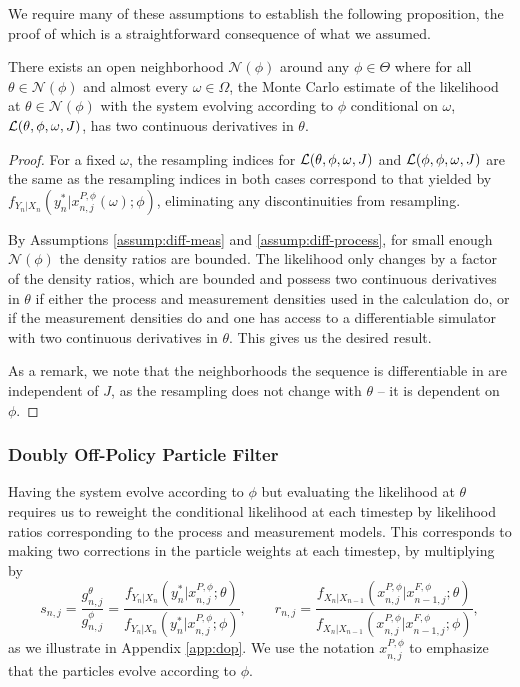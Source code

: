 \documentclass{article}
\begin{document}
We require many of these assumptions to establish the following proposition, the proof of which is a straightforward consequence of what we assumed.

\begin{prop}
\label{prop:smooth-nbhd}
There exists an open neighborhood $\mathcal{N}(\phi)$ around any $\phi \in \Theta$ where for all $\theta \in \mathcal{N}(\phi)$ and almost every $\omega \in \Omega$, the Monte Carlo estimate of the likelihood at $\theta \in \mathcal{N}(\phi)$ with the system evolving according to $\phi$ conditional on $\omega$, $\mathcal{L}(\theta,\phi,\omega, J)$, has two continuous derivatives in $\theta$.
\end{prop}

\begin{proof}
    For a fixed $\omega$, the resampling indices for $\mathcal{L}(\theta,\phi,\omega, J)$ and $\mathcal{L}(\phi,\phi,\omega, J)$ are the same as the resampling indices in both cases correspond to that yielded by $f_{Y_n|X_n}(y_n^*|x_{n,j}^{P,\phi}(\omega);\phi)$, eliminating any discontinuities from resampling. 
    
    By Assumptions \ref{assump:diff-meas} and \ref{assump:diff-process}, for small enough $\mathcal{N}(\phi)$ the density ratios are bounded. The likelihood only changes by a factor of the density ratios, which are bounded and possess two continuous derivatives in $\theta$ if either the process and measurement densities used in the calculation do, or if the measurement densities do and one has access to a differentiable simulator with two continuous derivatives in $\theta$. This gives us the desired result. 

    As a remark, we note that the neighborhoods the sequence is differentiable in are independent of $J$, as the resampling does not change with $\theta$ -- it is dependent on $\phi$. 
\end{proof}



\subsubsection{Doubly Off-Policy Particle Filter}

Having the system evolve according to $\phi$ but evaluating the likelihood at $\theta$ requires us to reweight the conditional likelihood at each timestep by likelihood ratios corresponding to the process and measurement models. This corresponds to making two corrections in the particle weights at each timestep, by multiplying by 
\begin{equation}
    s_{n,j}=\frac{g_{n,j}^\theta}{g_{n,j}^{\phi}}=\frac{f_{Y_n|X_n}(y_n^*|x_{n,j}^{P, \phi}; \theta)}{f_{Y_n|X_n}(y_n^*|x_{n,j}^{P,\phi}; \phi)}, \qquad r_{n,j}=\frac{f_{X_n|X_{n-1}}(x_{n,j}^{P, \phi}|x_{n-1,j}^{F, \phi}; \theta)}{f_{X_n|X_{n-1}}(x_{n,j}^{P, \phi}|x_{n-1,j}^{F, \phi}; \phi)},
\end{equation}
as we illustrate in Appendix \ref{app:dop}. We use the notation $x_{n,j}^{P, \phi}$ to emphasize that the particles evolve according to $\phi$. 
\end{document}
